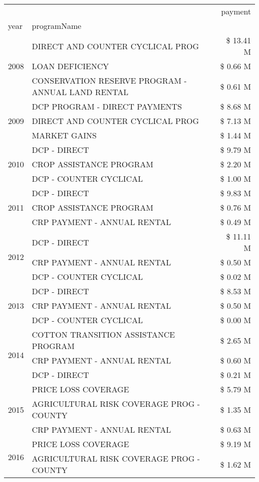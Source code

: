 \begin{tabular}{llr}
\toprule
 &  & payment \\
year & programName &  \\
\midrule
\multirow[t]{3}{*}{2008} & DIRECT AND COUNTER CYCLICAL PROG & \$ 13.41 M \\
 & LOAN DEFICIENCY & \$ 0.66 M \\
 & CONSERVATION RESERVE PROGRAM - ANNUAL LAND RENTAL & \$ 0.61 M \\
\cline{1-3}
\multirow[t]{3}{*}{2009} & DCP PROGRAM - DIRECT PAYMENTS & \$ 8.68 M \\
 & DIRECT AND COUNTER CYCLICAL PROG & \$ 7.13 M \\
 & MARKET GAINS & \$ 1.44 M \\
\cline{1-3}
\multirow[t]{3}{*}{2010} & DCP - DIRECT & \$ 9.79 M \\
 & CROP ASSISTANCE PROGRAM & \$ 2.20 M \\
 & DCP - COUNTER CYCLICAL & \$ 1.00 M \\
\cline{1-3}
\multirow[t]{3}{*}{2011} & DCP - DIRECT & \$ 9.83 M \\
 & CROP ASSISTANCE PROGRAM & \$ 0.76 M \\
 & CRP PAYMENT - ANNUAL RENTAL & \$ 0.49 M \\
\cline{1-3}
\multirow[t]{3}{*}{2012} & DCP - DIRECT & \$ 11.11 M \\
 & CRP PAYMENT - ANNUAL RENTAL & \$ 0.50 M \\
 & DCP - COUNTER CYCLICAL & \$ 0.02 M \\
\cline{1-3}
\multirow[t]{3}{*}{2013} & DCP - DIRECT & \$ 8.53 M \\
 & CRP PAYMENT - ANNUAL RENTAL & \$ 0.50 M \\
 & DCP - COUNTER CYCLICAL & \$ 0.00 M \\
\cline{1-3}
\multirow[t]{3}{*}{2014} & COTTON TRANSITION ASSISTANCE PROGRAM & \$ 2.65 M \\
 & CRP PAYMENT - ANNUAL RENTAL & \$ 0.60 M \\
 & DCP - DIRECT & \$ 0.21 M \\
\cline{1-3}
\multirow[t]{3}{*}{2015} & PRICE LOSS COVERAGE & \$ 5.79 M \\
 & AGRICULTURAL RISK COVERAGE PROG - COUNTY & \$ 1.35 M \\
 & CRP PAYMENT - ANNUAL RENTAL & \$ 0.63 M \\
\cline{1-3}
\multirow[t]{3}{*}{2016} & PRICE LOSS COVERAGE & \$ 9.19 M \\
 & AGRICULTURAL RISK COVERAGE PROG - COUNTY & \$ 1.62 M \\

\end{tabular}
